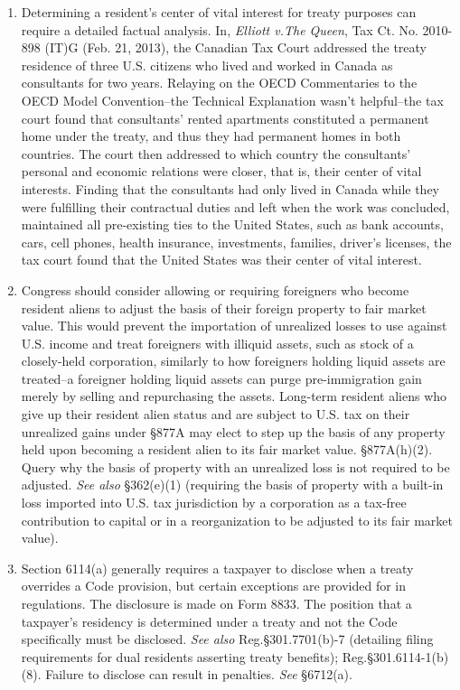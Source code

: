 	\begin{enumerate}
		\item Determining a resident's center of vital interest for treaty purposes can require a detailed factual analysis.  In, \emph{Elliott v.\@ The Queen}, Tax Ct. No. 2010-898 (IT)G (Feb. 21, 2013), the Canadian Tax Court addressed the treaty residence of three U.S. citizens who lived and worked in Canada as consultants for two years.  Relaying on the OECD Commentaries to the OECD Model Convention--the Technical Explanation wasn't helpful--the tax court found that consultants' rented apartments constituted a permanent home under the treaty, and thus they had permanent homes in both countries.  The court then addressed to which country the consultants' personal and economic relations were closer, that is, their center of vital interests.  Finding that the consultants had only lived in Canada while they were fulfilling their contractual duties and left when the work was concluded, maintained all pre-existing ties to the United States, such as bank accounts, cars, cell phones, health insurance, investments, families, driver's licenses, the tax court found that the United States was their center of vital interest.
		
		\item Congress should consider allowing or requiring foreigners who become resident aliens to adjust the basis of their foreign property to fair market value.  This would prevent the importation of unrealized losses to use against U.S. income and treat foreigners with illiquid assets, such as stock of a closely-held corporation, similarly to how foreigners holding liquid assets are treated--a foreigner holding liquid assets can purge pre-immigration gain merely by selling and repurchasing the assets.  Long-term resident aliens who give up their resident alien status and are subject to U.S. tax on their unrealized gains under \S877A may elect to step up the basis of any property held upon becoming a resident alien to its fair market value.  \S877A(h)(2).  Query why the basis of property with an unrealized loss is not required to be adjusted.  \emph{See also} \S362(e)(1) (requiring the basis of property with a built-in loss imported into U.S. tax jurisdiction by a corporation as a tax-free contribution to capital or in a reorganization to be adjusted to its fair market value).
		
		\item Section 6114(a) generally requires a taxpayer to disclose when a treaty overrides a Code provision, but certain exceptions are provided for in regulations.  The disclosure is made on Form 8833.  The position that a taxpayer's residency is determined under a treaty and not the Code specifically must be disclosed.  \emph{See also} Reg.\@ \S 301.7701(b)-7 (detailing filing requirements for dual residents asserting treaty benefits); Reg.\@ \S 301.6114-1(b)(8).  Failure to disclose can result in penalties.  \emph{See} \S6712(a).


\end{enumerate}
